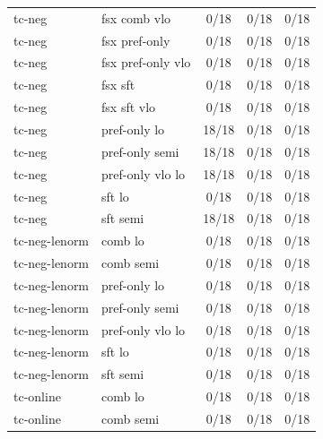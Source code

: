 \documentclass[10pt,landscape]{article}
\begin{document}
\begin{tabular}{llccc}
tc-neg & fsx comb vlo & \cellcolor{missing}0/18 & \cellcolor{missing}0/18 & \cellcolor{missing}0/18 \\
tc-neg & fsx pref-only & \cellcolor{missing}0/18 & \cellcolor{missing}0/18 & \cellcolor{missing}0/18 \\
tc-neg & fsx pref-only vlo & \cellcolor{missing}0/18 & \cellcolor{missing}0/18 & \cellcolor{missing}0/18 \\
tc-neg & fsx sft & \cellcolor{missing}0/18 & \cellcolor{missing}0/18 & \cellcolor{missing}0/18 \\
tc-neg & fsx sft vlo & \cellcolor{missing}0/18 & \cellcolor{missing}0/18 & \cellcolor{missing}0/18 \\
tc-neg & pref-only lo & \cellcolor{done}18/18 & \cellcolor{missing}0/18 & \cellcolor{missing}0/18 \\
tc-neg & pref-only semi & \cellcolor{done}18/18 & \cellcolor{missing}0/18 & \cellcolor{missing}0/18 \\
tc-neg & pref-only vlo lo & \cellcolor{done}18/18 & \cellcolor{missing}0/18 & \cellcolor{missing}0/18 \\
tc-neg & sft lo & \cellcolor{missing}0/18 & \cellcolor{missing}0/18 & \cellcolor{missing}0/18 \\
tc-neg & sft semi & \cellcolor{done}18/18 & \cellcolor{missing}0/18 & \cellcolor{missing}0/18 \\
tc-neg-lenorm & comb lo & \cellcolor{missing}0/18 & \cellcolor{missing}0/18 & \cellcolor{missing}0/18 \\
tc-neg-lenorm & comb semi & \cellcolor{missing}0/18 & \cellcolor{missing}0/18 & \cellcolor{missing}0/18 \\
tc-neg-lenorm & pref-only lo & \cellcolor{missing}0/18 & \cellcolor{missing}0/18 & \cellcolor{missing}0/18 \\
tc-neg-lenorm & pref-only semi & \cellcolor{missing}0/18 & \cellcolor{missing}0/18 & \cellcolor{missing}0/18 \\
tc-neg-lenorm & pref-only vlo lo & \cellcolor{missing}0/18 & \cellcolor{missing}0/18 & \cellcolor{missing}0/18 \\
tc-neg-lenorm & sft lo & \cellcolor{missing}0/18 & \cellcolor{missing}0/18 & \cellcolor{missing}0/18 \\
tc-neg-lenorm & sft semi & \cellcolor{missing}0/18 & \cellcolor{missing}0/18 & \cellcolor{missing}0/18 \\
tc-online & comb lo & \cellcolor{missing}0/18 & \cellcolor{missing}0/18 & \cellcolor{missing}0/18 \\
tc-online & comb semi & \cellcolor{missing}0/18 & \cellcolor{missing}0/18 & \cellcolor{missing}0/18 \\

\end{tabular}
\end{document}
